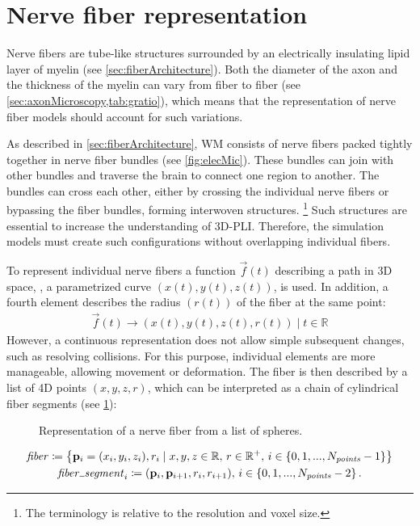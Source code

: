 \section{Nerve fiber representation}
\label{sec:nerve_fiber_representation}
%
Nerve fibers are tube-like structures surrounded by an electrically insulating lipid layer of myelin (see \cref{sec:fiberArchitecture}).
Both the diameter of the axon and the thickness of the myelin can vary from fiber to fiber (see \cref{sec:axonMicroscopy,tab:gratio}), which
means that the representation of nerve fiber models should account for such variations.
\par
%
As described in \cref{sec:fiberArchitecture}, \ac{WM} consists of nerve fibers packed tightly together in nerve fiber bundles (see \cref{fig:elecMic}).
These bundles can join with other bundles and traverse the brain to connect one region to another.
The bundles can cross each other, either by crossing the individual nerve fibers or bypassing the fiber bundles, forming interwoven structures.
\footnote{The terminology  is relative to the resolution and voxel size.}
Such structures are essential to increase the understanding of \ac{3D-PLI}.
Therefore, the simulation models must create such configurations without overlapping individual fibers.
\par
%
To represent individual nerve fibers a function $\vec{f}(t)$ describing a path in 3D space, \ie{}, a parametrized curve $(x(t), y(t), z(t))$, is used.
In addition, a fourth element describes the radius $(r(t))$ of the fiber at the same point:
% 
\begin{align}
\vec{f}(t) \rightarrow (x(t), y(t), z(t), r(t)) \; | \; t \in \mathbb{R}
\end{align}
% 
However, a continuous representation does not allow simple subsequent changes, such as resolving collisions.
For this purpose, individual elements are more manageable, allowing movement or deformation.
The fiber is then described by a list of 4D points $(x,y,z,r)$, which can be interpreted as a chain of cylindrical fiber segments (see \cref{fig:fiberReb}):
%
\begin{figure}[!t]
    \setlength{\tikzwidth}{0.85\textwidth}
    \centering
	\caption[]{Representation of a nerve fiber from a list of spheres.}
	\label{fig:fiberReb}
\end{figure}
% 
\begin{align}
\begin{gathered}
\mathit{fiber} \coloneqq \left\{ \vec{p}_i=(x_i,y_i,z_i), r_i \mid x,y,z \in \mathbb{R}, \, r \in \mathbb{R^+}, \, i \in \{0,1,...,N_{\mathit{points}}-1\}\right\} \\
\mathit{fiber\tum{}segment}_i \coloneqq (\vec{p}_i, \vec{p}_{i+1}, r_i, r_{i+1}), \, i \in \{0,1,...,N_{\mathit{points}}-2\} \, .
\end{gathered}
\end{align}
